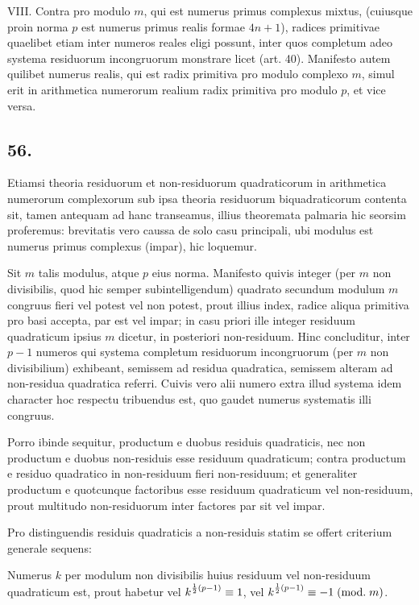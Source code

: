 \documentclass[twoside,12pt, showframe]{memoir}
\renewcommand{\pmod}[1]{\;(\textrm{mod.}\;#1)}
\let\oldfrac\frac
\def\frac#1#2{\mathchoice{\tfrac{#1}{#2}}{\oldfrac{#1}{#2}}{\genfrac{}{}{}{2}{#1}{#2\mathstrut}}{\genfrac{}{}{}{3}{#1}{#2\mathstrut}}}
\begin{document}
VIII. Contra pro modulo \(m\), qui est numerus primus complexus mixtus, (cuiusque proin norma \(p\) est numerus primus realis formae \(4 n+1\)), radices primitivae quaelibet etiam inter numeros reales eligi possunt, inter quos completum adeo systema residuorum incongruorum monstrare licet (art. 40). Manifesto autem quilibet numerus realis, qui est radix primitiva pro modulo complexo \(m\), simul erit in arithmetica numerorum realium radix primitiva pro modulo \(p\), et vice versa.

\subsection*{56.}
 
Etiamsi theoria residuorum et non-residuorum quadraticorum in arithmetica numerorum complexorum sub ipsa theoria residuorum biquadraticorum contenta sit, tamen antequam ad hanc transeamus, illius theoremata palmaria hic seorsim proferemus: brevitatis vero caussa de solo casu principali, ubi modulus est numerus primus complexus (impar), hic loquemur.

Sit \(m\) talis modulus, atque \(p\) eius norma. Manifesto quivis integer (per \(m\) non divisibilis, quod hic semper subintelligendum) quadrato secundum modulum \(m\) congruus fieri vel potest vel non potest, prout illius index, radice aliqua primitiva pro basi accepta, par est vel impar; in casu priori ille integer residuum quadraticum ipsius \(m\) dicetur, in posteriori non-residuum. Hinc concluditur, inter \(p-1\) numeros qui systema completum residuorum incongruorum (per \(m\) non divisibilium) exhibeant, semissem ad residua quadratica, semissem alteram ad non-residua quadratica referri. Cuivis vero alii numero extra illud systema idem\clearpage\noindent%
character hoc respectu tribuendus est, quo gaudet numerus systematis illi congruus.
 
Porro ibinde sequitur, productum e duobus residuis quadraticis, nec non productum e duobus non-residuis esse residuum quadraticum; contra productum e residuo quadratico in non-residuum fieri non-residuum; et generaliter productum e quotcunque factoribus esse residuum quadraticum vel non-residuum, prout multitudo non-residuorum inter factores par sit vel impar.

Pro distinguendis residuis quadraticis a non-residuis statim se offert criterium generale sequens:
 
Numerus \(k\) per modulum non divisibilis huius residuum vel non-residuum quadraticum est, prout habetur vel \(k^{\frac{1}{2}(p-1)} \equiv 1\), vel \(k^{\frac{1}{2}(p-1)} \equiv-1\pmod{m}\).
 
\end{document}
